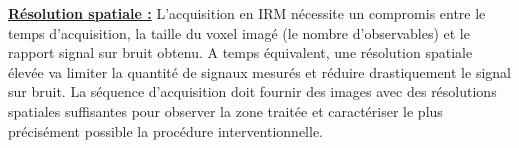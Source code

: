 
\underline{\textbf{Résolution spatiale :}} L’acquisition en IRM nécessite un compromis entre le temps d’acquisition, la taille du voxel imagé (le nombre d’observables) et le rapport signal sur bruit obtenu. A temps équivalent, une résolution spatiale élevée va limiter la quantité de signaux mesurés et réduire drastiquement le signal sur bruit. La séquence d’acquisition doit fournir des images avec des résolutions spatiales suffisantes pour observer la zone traitée et caractériser le plus précisément possible la procédure interventionnelle.\\

